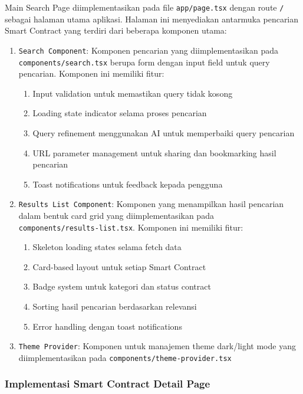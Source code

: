 Main Search Page diimplementasikan pada file \texttt{app/page.tsx} dengan route \texttt{/} sebagai halaman utama aplikasi. Halaman ini menyediakan antarmuka pencarian Smart Contract yang terdiri dari beberapa komponen utama:

\begin{enumerate}
	\item \texttt{Search Component}: Komponen pencarian yang diimplementasikan pada \texttt{components/search.tsx} berupa form dengan input field untuk query pencarian. Komponen ini memiliki fitur:
	      \begin{enumerate}
		      \item Input validation untuk memastikan query tidak kosong
		      \item Loading state indicator selama proses pencarian
		      \item Query refinement menggunakan AI untuk memperbaiki query pencarian
		      \item URL parameter management untuk sharing dan bookmarking hasil pencarian
		      \item Toast notifications untuk feedback kepada pengguna
	      \end{enumerate}
	\item \texttt{Results List Component}: Komponen yang menampilkan hasil pencarian dalam bentuk card grid yang diimplementasikan pada \\\texttt{components/results-list.tsx}. Komponen ini memiliki fitur:
	      \begin{enumerate}
		      \item Skeleton loading states selama fetch data
		      \item Card-based layout untuk setiap Smart Contract
		      \item Badge system untuk kategori dan status contract
		      \item Sorting hasil pencarian berdasarkan relevansi
		      \item Error handling dengan toast notifications
	      \end{enumerate}
	\item \texttt{Theme Provider}: Komponen untuk manajemen theme dark/light mode yang diimplementasikan pada \texttt{components/theme-provider.tsx}
\end{enumerate}

\subsubsection{Implementasi Smart Contract Detail Page}

